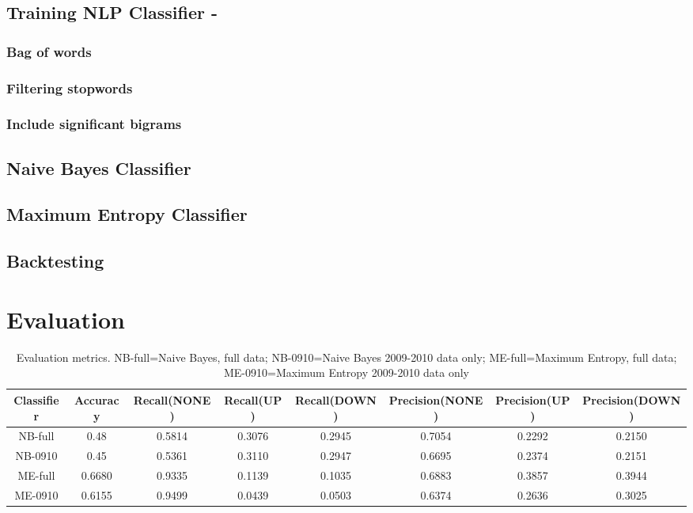 \documentclass[]{article}
\begin{document}
\subsection{Training NLP Classifier - }
\subsubsection{Bag of words}
\subsubsection{Filtering stopwords}
\subsubsection{Include significant bigrams}
\subsection{Naive Bayes Classifier}
\subsection{Maximum Entropy Classifier}
\subsection{Backtesting}
\section{Evaluation}

\begin{table}
\centering
\begin{tabular}{| c | c | c | c | c | c|c|c|}
\hline
Classifier & Accuracy & Recall(NONE) &Recall(UP)&Recall(DOWN)&Precision(NONE)&Precision(UP)&Precision(DOWN)\\
\hline
NB-full & 0.48 & 0.5814 & 0.3076 & 0.2945 & 0.7054 & 0.2292 & 0.2150\\
\hline
NB-0910 & 0.45 & 0.5361 & 0.3110 & 0.2947 & 0.6695 & 0.2374 & 0.2151\\
\hline
ME-full & 0.6680 & 0.9335 & 0.1139 & 0.1035 & 0.6883 & 0.3857 & 0.3944\\
\hline
ME-0910 & 0.6155 & 0.9499 & 0.0439 & 0.0503 & 0.6374 & 0.2636 & 0.3025 \\
\hline

\end{tabular}
\caption{Evaluation metrics. NB-full=Naive Bayes, full data; NB-0910=Naive Bayes 2009-2010 data only; ME-full=Maximum Entropy, full data; ME-0910=Maximum Entropy 2009-2010 data only}
\end{table}
\end{document}
